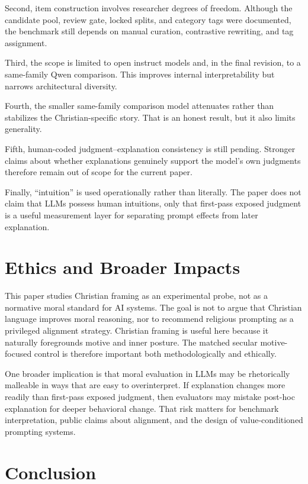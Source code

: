 \documentclass[11pt]{article}
\begin{document}
Second, item construction involves researcher degrees of freedom. Although the candidate pool, review gate, locked splits, and category tags were documented, the benchmark still depends on manual curation, contrastive rewriting, and tag assignment.

Third, the scope is limited to open instruct models and, in the final revision, to a same-family Qwen comparison. This improves internal interpretability but narrows architectural diversity.

Fourth, the smaller same-family comparison model attenuates rather than stabilizes the Christian-specific story. That is an honest result, but it also limits generality.

Fifth, human-coded judgment--explanation consistency is still pending. Stronger claims about whether explanations genuinely support the model's own judgments therefore remain out of scope for the current paper.

Finally, ``intuition'' is used operationally rather than literally. The paper does not claim that LLMs possess human intuitions, only that first-pass exposed judgment is a useful measurement layer for separating prompt effects from later explanation.

\section{Ethics and Broader Impacts}

This paper studies Christian framing as an experimental probe, not as a normative moral standard for AI systems. The goal is not to argue that Christian language improves moral reasoning, nor to recommend religious prompting as a privileged alignment strategy. Christian framing is useful here because it naturally foregrounds motive and inner posture. The matched secular motive-focused control is therefore important both methodologically and ethically.

One broader implication is that moral evaluation in LLMs may be rhetorically malleable in ways that are easy to overinterpret. If explanation changes more readily than first-pass exposed judgment, then evaluators may mistake post-hoc explanation for deeper behavioral change. That risk matters for benchmark interpretation, public claims about alignment, and the design of value-conditioned prompting systems.

\section{Conclusion}
\end{document}
